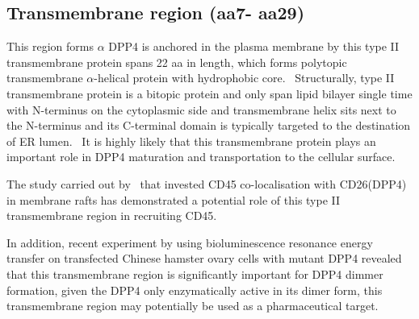 \subsection{Transmembrane region (aa7- aa29)}

This region forms $\alpha$
DPP4 is anchored in the plasma membrane by this type II transmembrane protein spans 22 aa in length, which forms polytopic transmembrane $\alpha$-helical protein with hydrophobic core.~\cite{Hong_1990} Structurally, type II transmembrane protein is a bitopic protein and only span lipid bilayer single time with N-terminus on the cytoplasmic side and transmembrane helix sits next to the N-terminus and its C-terminal domain is typically targeted to the destination of ER lumen.~\cite{Luckey} It is highly likely that this transmembrane protein plays an important role in DPP4 maturation and transportation to the cellular surface. 
\par
The study carried out by~\citet{Ishii2001} that invested CD45 co-localisation with CD26(DPP4) in membrane rafts has demonstrated a potential role of this type II transmembrane region in recruiting CD45. 
\par
In addition, recent experiment by \citet{Chung_2010} using bioluminescence resonance energy transfer on transfected Chinese hamster ovary cells with mutant DPP4 revealed that this transmembrane region is significantly important for DPP4 dimmer formation, given the DPP4 only enzymatically active in its dimer form, this transmembrane region may potentially be used as a pharmaceutical target.
